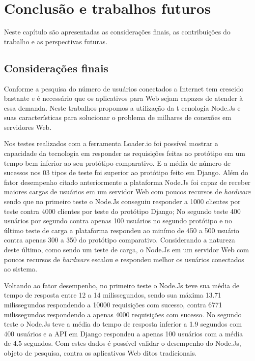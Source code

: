 \vspace{-1.9cm}

\chapter{Conclusão e trabalhos futuros}
\label{conslusao-e-trabalhos-furutos}

  Neste capítulo são apresentadas as considerações finais, as contribuições do
  trabalho e as perspectivas futuras.


\section{Considerações finais}
\label{conslusao-do-trabalho}


  Conforme a pesquisa do \cite{IBGE:2013} número de usuários conectados a Internet tem crescido bastante e é necessário
  que os aplicativos para Web sejam capazes de atender à essa demanda. Neste trabalhos propomos a utilização da t
  ecnologia Node.Js e suas características para solucionar o problema de milhares de conexões em servidores Web.
  
  Nos testes realizados com a ferramenta Loader.io foi possível mostrar a capacidade da tecnologia em responder as requisições
  feitas ao protótipo em um tempo bem inferior ao seu protótipo comparativo. E a média de número de sucessos nos 03 tipos de 
  teste foi superior ao protótipo feito em Django. Além do fator desempenho citado anteriormente a plataforma Node.Js foi capaz
  de receber maiores cargas de usuários em um servidor Web com poucos recursos de \textit{hardware} sendo que no primeiro teste o
  Node.Js conseguiu responder a 1000 clientes por teste contra 4000 clientes por teste do protótipo Django; No segundo teste
  400 usuários por segundo contra apenas 100 usuários no segundo protótipo e no último teste de carga a plataforma respondeu
  ao minímo de 450 a 500 usuário contra apenas 300 a 350 do protótipo comparativo. Considerando a natureza deste último, como
  sendo um teste de carga, o Node.Js em um servidor Web com poucos recursos de \textit{hardware} escalou e respondeu melhor
  os usuários conectados ao sistema.
  
  Voltando ao fator desempenho, no primeiro teste o Node.Js teve sua média de tempo de resposta entre 12 a 14 milissegundos, sendo 
  sua máxima 13.71 milissegundos respondendo a 10000 requisições com sucesso, contra 6771 milissegundos respondendo a apenas 4000
  requisições com sucesso. No segundo teste o Node.Js teve a média do tempo de resposta inferior a  1.9 segundos com 400 usuários
  e a API em Django respondeu a apenas 100 usuários com a média de 4.5 segundos. Com estes dados é possível validar o desempenho
  do Node.Js, objeto de pesquisa, contra os aplicativos Web ditos tradicionais.
  
